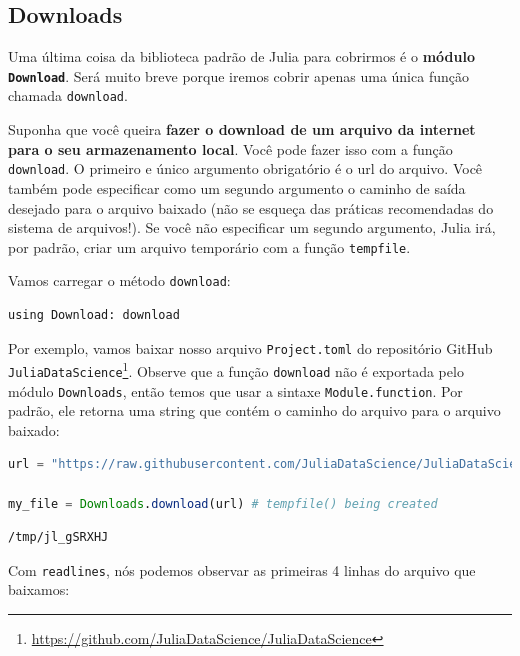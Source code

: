 \documentclass[
  notoc %
]{tufte-book}
\DeclareRobustCommand{\href}[2]{#2\footnote{\url{#1}}}
\newcommand{\passthrough}[1]{#1}
\begin{document}
\hypertarget{sec:downloads}{%
\subsection{Downloads}\label{sec:downloads}}

Uma última coisa da biblioteca padrão de Julia para cobrirmos é o
\textbf{módulo \passthrough{\lstinline!Download!}}. Será muito breve
porque iremos cobrir apenas uma única função chamada
\passthrough{\lstinline!download!}.

Suponha que você queira \textbf{fazer o download de um arquivo da
internet para o seu armazenamento local}. Você pode fazer isso com a
função \passthrough{\lstinline!download!}. O primeiro e único argumento
obrigatório é o url do arquivo. Você também pode especificar como um
segundo argumento o caminho de saída desejado para o arquivo baixado
(não se esqueça das práticas recomendadas do sistema de arquivos!). Se
você não especificar um segundo argumento, Julia irá, por padrão, criar
um arquivo temporário com a função \passthrough{\lstinline!tempfile!}.

Vamos carregar o método \passthrough{\lstinline!download!}:

\begin{lstlisting}
using Download: download
\end{lstlisting}

Por exemplo, vamos baixar nosso arquivo
\passthrough{\lstinline!Project.toml!} do
\href{https://github.com/JuliaDataScience/JuliaDataScience}{repositório
GitHub \passthrough{\lstinline!JuliaDataScience!}}. Observe que a função
\passthrough{\lstinline!download!} não é exportada pelo módulo
\passthrough{\lstinline!Downloads!}, então temos que usar a sintaxe
\passthrough{\lstinline!Module.function!}. Por padrão, ele retorna uma
string que contém o caminho do arquivo para o arquivo baixado:

\begin{lstlisting}[language=Julia]
url = "https://raw.githubusercontent.com/JuliaDataScience/JuliaDataScience/main/Project.toml"

my_file = Downloads.download(url) # tempfile() being created
\end{lstlisting}

\begin{lstlisting}[language=Output]
/tmp/jl_gSRXHJ
\end{lstlisting}

Com \passthrough{\lstinline!readlines!}, nós podemos observar as
primeiras 4 linhas do arquivo que baixamos:
\end{document}
